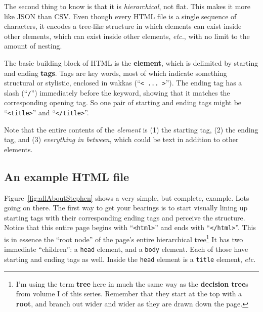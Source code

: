 
The second thing to know is that it is \textit{hierarchical}, not flat. This
makes it more like JSON than CSV. Even though every HTML file is a single
sequence of characters, it encodes a tree-like structure in which elements can
exist inside other elements, which can exist inside other elements,
\textit{etc.}, with no limit to the amount of nesting.



The basic building block of HTML is the \textbf{element}, which is delimited by
starting and ending \textbf{tags}. Tags are key words, most of which indicate
something structural or stylistic, enclosed in wakkas (``\texttt{< ... >}'').
The ending tag has a slash (``\texttt{/}'') immediately before the keyword,
showing that it matches the corresponding opening tag. So one pair of starting
and ending tags might be ``\texttt{<title>}'' and ``\texttt{</title>}''.

Note that the entire contents of the \textit{element} is (1) the starting tag,
(2) the ending tag, and (3) \textit{everything in between}, which could be
text in addition to other elements.

\subsection{An example HTML file}


Figure~\ref{fig:allAboutStephen} shows a very simple, but complete, example.
Lots going on there. The first way to get your bearings is to start visually
lining up starting tags with their corresponding ending tags and perceive the
structure. Notice that this entire page begins with ``\texttt{<html>}'' and
ends with ``\texttt{</html>}''. This is in essence the ``root node'' of the
page's entire hierarchical tree\footnote{I'm using the term \textbf{tree} here
in much the same way as the \textbf{decision tree}s from volume I of this
series. Remember that they start at the top with a \textbf{root}, and branch
out wider and wider as they are drawn down the page.} It has two immediate
``children'': a \texttt{head} element, and a \texttt{body} element. Each of
those have starting and ending tags as well. Inside the \texttt{head} element
is a \texttt{title} element, \textit{etc.}

